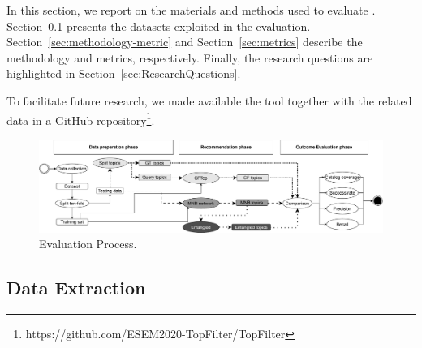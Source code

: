 





In this section, we report on the materials and methods used to evaluate \TF. %
Section~\ref{sec:Dataset} presents the datasets exploited in the evaluation. Section~\ref{sec:methodology-metric} and Section~\ref{sec:metrics} describe the methodology and metrics, respectively. Finally, the research questions are highlighted in Section~\ref{sec:ResearchQuestions}.

To facilitate future research, we made available the \TF tool together with the related data in a GitHub repository\footnote{https://github.com/ESEM2020-TopFilter/TopFilter}.


\begin{figure}[h!]
	\centering
	\includegraphics[width=0.9\linewidth,keepaspectratio]{figs/evaluationCF.pdf}
	\caption{Evaluation Process.}
	\label{fig:EvaluationProcess}
	\vspace{-.3cm}
\end{figure}

\subsection{Data Extraction} \label{sec:Dataset}









